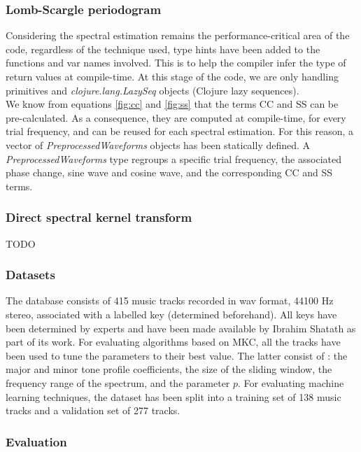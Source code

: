 \documentclass[letterpaper]{article}
\begin{document}
\subsubsection{Lomb-Scargle periodogram}

Considering the spectral estimation remains the performance-critical area of the code, regardless of the technique used, type hints have been added to the functions and var names involved. This is to help the compiler infer the type of return values at compile-time.
At this stage of the code, we are only handling primitives and \textit{clojure.lang.LazySeq} objects (Clojure lazy sequences).\\

We know from equations \ref{fig:cc} and \ref{fig:ss} that the terms CC and SS can be pre-calculated. As a consequence, they are computed at compile-time,
for every trial frequency, and can be reused for each spectral estimation. For this reason, a vector of \textit{PreprocessedWaveforms} objects has been statically defined. A \textit{PreprocessedWaveforms}
type regroups a specific trial frequency, the associated phase change, sine wave and cosine wave, and the corresponding CC and SS terms.\\

\subsubsection{Direct spectral kernel transform}

TODO

\subsubsection{Datasets}

The database consists of 415 music tracks recorded in wav format, 44100 Hz stereo, associated with a labelled key (determined beforehand). 
All keys have been determined
by experts and have been made available by Ibrahim Shat\textquotesingle ath as part of its work. For evaluating algorithms based on MKC,
all the tracks have been used to tune the parameters to their best value. The latter consist of : the major and minor tone profile coefficients,
the size of the sliding window, the frequency range of the spectrum, and the parameter $p$. For evaluating machine learning techniques,
the dataset has been split into a training set of 138 music tracks and a validation set of 277 tracks.

\subsubsection{Evaluation}
\end{document}
